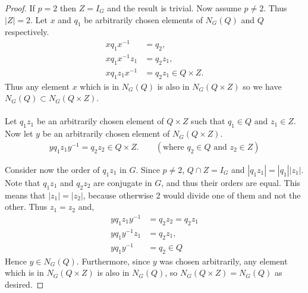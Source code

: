 \begin{proof} 

If $p = 2$ then $Z = I_G$ and the result is trivial. Now assume $p \neq 2$. Thus $|Z| = 2$. Let $x$ and $q_1$ be arbitrarily chosen elements of $N_G(Q)$ and $Q$ respectively.
\begin{align*} xq_1x^{-1} &= q_2, \tag{for some $q_2 \in Q$}
\\ xq_1x^{-1}z_1 &= q_2z_1,
\\ xq_1z_1x^{-1} &= q_2z_1 \in Q \times Z.
\end{align*}
Thus any element $x$ which is in $N_G(Q)$ is also in $N_G(Q \times Z)$ so we have $N_G(Q) \subset N_G(Q \times Z)$. \\
\\
Let $q_1 z_1$ be an arbitrarily chosen element of $Q \times Z$ such that $q_1 \in Q$ and $z_1 \in Z$. Now let $y$ be an arbitrarily chosen element of $N_G(Q \times Z)$.
\begin{align*} y q_1 z_1 y^{-1} = q_2 z_2 \in Q \times Z. \qquad (\text{where $q_2 \in Q$ and $z_2 \in Z$}) 
\end{align*}

Consider now the order of $q_1z_1$ in $G$. Since $p \neq 2$, $Q \cap Z = I_G$ and $|q_1 z_1| = |q_1| |z_1|$. Note that $q_1 z_1$ and $q_2 z_2$ are conjugate in $G$, and thus their orders are equal. This means that $|z_1| = |z_2|$, because otherwise 2 would divide one of them and not the other. Thus $z_1 = z_2$ and,
\begin{align*} y q_1z_1 y^{-1} &=  q_2z_2 = q_2z_1
\\ y q_1 y^{-1} z_1 &= q_2z_1,
\\ y q_1 y^{-1} &= q_2 \in Q
\end{align*}
Hence $y \in N_G(Q)$. Furthermore, since $y$ was chosen arbitrarily, any element which is in $N_G(Q \times Z)$ is also in $N_G(Q)$, so $N_G(Q \times Z) = N_G(Q)$ as desired.

\end{proof}

